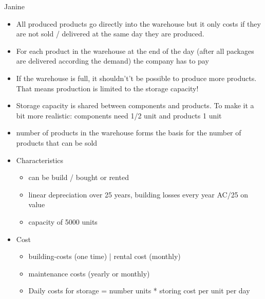 Janine \\
\begin{itemize}
    \item All produced products go directly into the warehouse but it only costs if they are not sold / delivered at the same day they are produced.
    \item For each product in the warehouse at the end of the day (after all packages are delivered according the demand) the company has to pay
    \item If the warehouse is full, it shouldn't’t be possible to produce more products. That means production is limited to the storage capacity! 
    \item Storage capacity is shared between components and products. To make it a bit more realistic: components need 1/2 unit and products 1 unit
    \item number of products in the warehouse forms the basis for the number of products that can be sold
    \item Characteristics 
    \begin{itemize}
        \item can be build / bought or rented
        \item linear depreciation over 25 years, building losses every year AC/25 on value 
        \item capacity of 5000 units
    \end{itemize}
    \item Cost 
    \begin{itemize}
        \item building-costs (one time) | rental cost (monthly)
        \item maintenance costs (yearly or monthly) 
        \item Daily costs for storage = number units * storing cost per unit per day
    \end{itemize}
\end{itemize}